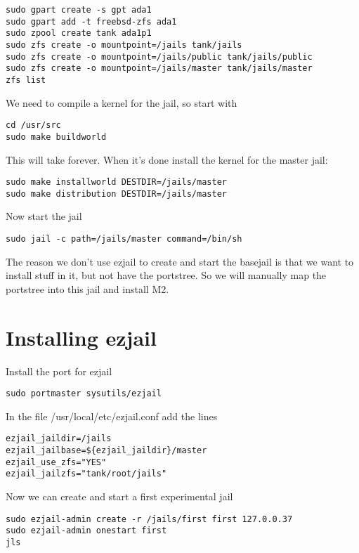 \documentclass[a4paper]{article}
\begin{document}
\begin{verbatim}
sudo gpart create -s gpt ada1
sudo gpart add -t freebsd-zfs ada1
sudo zpool create tank ada1p1
sudo zfs create -o mountpoint=/jails tank/jails
sudo zfs create -o mountpoint=/jails/public tank/jails/public
sudo zfs create -o mountpoint=/jails/master tank/jails/master
zfs list
\end{verbatim}


We need to compile a kernel for the jail, so start with

\begin{verbatim}
cd /usr/src
sudo make buildworld
\end{verbatim}

This will take forever.
When it's done install the kernel for the master jail:

\begin{verbatim}
sudo make installworld DESTDIR=/jails/master
sudo make distribution DESTDIR=/jails/master
\end{verbatim}

Now start the jail

\begin{verbatim}
sudo jail -c path=/jails/master command=/bin/sh
\end{verbatim}

The reason we don't use ezjail to create and start the basejail is that we want to install stuff in it, but not have the portstree. 
So we will manually map the portstree into this jail and install M2.

\section{Installing ezjail}
Install the port for ezjail

\begin{verbatim}
sudo portmaster sysutils/ezjail
\end{verbatim}

In the file /usr/local/etc/ezjail.conf add the lines

\begin{verbatim}
ezjail_jaildir=/jails
ezjail_jailbase=${ezjail_jaildir}/master
ezjail_use_zfs="YES"
ezjail_jailzfs="tank/root/jails"
\end{verbatim}

Now we can create and start a first experimental jail

\begin{verbatim}
sudo ezjail-admin create -r /jails/first first 127.0.0.37
sudo ezjail-admin onestart first
jls
\end{verbatim}
\end{document}
